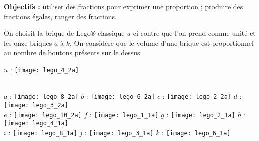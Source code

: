\begin{activite}
   {\bf Objectifs :} utiliser des fractions pour exprimer une proportion ; produire des fractions égales, ranger des fractions. \\
   \begin{QCM}
       \medskip
         \begin{minipage}{10cm}
            On choisit la brique de Lego® classique $u$ ci-contre que l'on prend comme unité et les onze briques $a$ à $k$. On considère que le volume d'une brique est proportionnel au nombre de \og boutons \fg{} présents sur le dessus.
         \end{minipage}
         \hspace{1cm}
         \begin{minipage}{5cm}
            $u$ : \texttt{[image: lego\_4\_2a]}
         \end{minipage} \\ [10mm]
            $a$ : \texttt{[image: lego\_8\_2a]} \qquad 
            $b$ : \texttt{[image: lego\_6\_2a]} \qquad
            $c$ : \texttt{[image: lego\_2\_2a]} \qquad
            $d$ : \texttt{[image: lego\_3\_2a]} \\ [5mm]
            $e$ : \texttt{[image: lego\_10\_2a]} \qquad
            $f$ : \texttt{[image: lego\_1\_1a]} \qquad
            $g$ : \texttt{[image: lego\_2\_1a]} \qquad
            $h$ : \texttt{[image: lego\_4\_1a]} \\ [5mm]
            $i$ : \texttt{[image: lego\_8\_1a]} \qquad
            $j$ : \texttt{[image: lego\_3\_1a]} \qquad
            $k$ : \texttt{[image: lego\_6\_1a]} \\
            

\end{QCM}
\end{activite}

